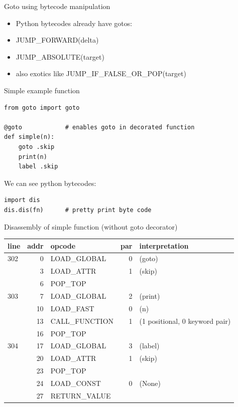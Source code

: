 \documentclass{beamer}
\begin{document}
\begin{frame}[fragile]{Goto using bytecode manipulation}

\begin{itemize}
\item Python bytecodes already have gotos:
\item JUMP\_FORWARD(delta)
\item JUMP\_ABSOLUTE(target)
\item also exotics like JUMP\_IF\_FALSE\_OR\_POP(target)
\end{itemize}

\end{frame}

\begin{frame}[fragile]{Simple example function}



\begin{verbatim}
from goto import goto

@goto            # enables goto in decorated function
def simple(n):
    goto .skip
    print(n)
    label .skip
\end{verbatim}

We can see python bytecodes:

\begin{verbatim}
import dis
dis.dis(fn)      # pretty print byte code
\end{verbatim}

\end{frame}

\begin{frame}[fragile]{Disassembly of simple function (without goto decorator)}
\begin{tabular}{l|r|l|r|l}
line & addr & opcode & par & interpretation \\
\hline
302 &          0 & LOAD\_GLOBAL         &     0 & (goto)  \\
     &           3 &  LOAD\_ATTR               &   1  & (skip)  \\
      &          6 &  POP\_TOP      &  &           \\
\hline
303   &          7 &  LOAD\_GLOBAL         &       2  & (print)  \\
          &     10 &  LOAD\_FAST           &       0 &  (n)  \\
              & 13 &  CALL\_FUNCTION        &      1  & (1 positional, 0 keyword pair)  \\
     &          16 &  POP\_TOP            &     &  \\
\hline
304   &         17 &  LOAD\_GLOBAL        &        3  & (label)  \\
     &          20 &  LOAD\_ATTR          &        1  & (skip)  \\
     &          23 &  POP\_TOP            &     &  \\
\hline     
     &          24 &  LOAD\_CONST         &        0  & (None)  \\
     &          27 &  RETURN\_VALUE      &      &  \\
\end{tabular}
\end{frame}
\end{document}
